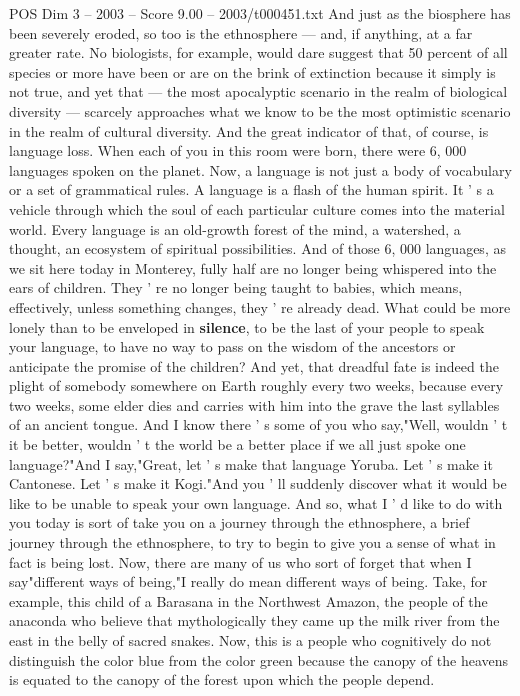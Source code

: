 \begin{textsample}{POS Dim 3 – 2003 – Score 9.00 – 2003/t000451.txt}
And just as the biosphere has been severely eroded, so too is the ethnosphere — and, if anything, at a far greater rate.
No biologists, for example, would dare suggest that 50 percent of all species or more have been or are on the brink of extinction because it simply is not true, and yet that — the most apocalyptic scenario in the realm of biological diversity — scarcely approaches what we know to be the most optimistic scenario in the realm of cultural diversity.
And the great indicator of that, of course, is language loss.
When each of you in this room were born, there were 6, 000 languages spoken on the planet.
Now, a language is not just a body of vocabulary or a set of grammatical rules.
A language is a flash of the human spirit.
It ' s a vehicle through which the soul of each particular culture comes into the material world.
Every language is an old-growth forest of the mind, a watershed, a thought, an ecosystem of spiritual possibilities.
And of those 6, 000 languages, as we sit here today in Monterey, fully half are no longer being whispered into the ears of children.
They ' re no longer being taught to babies, which means, effectively, unless something changes, they ' re already dead.
What could be more lonely than to be enveloped in \textbf{silence}, to be the last of your people to speak your language, to have no way to pass on the wisdom of the ancestors or anticipate the promise of the children?
And yet, that dreadful fate is indeed the plight of somebody somewhere on Earth roughly every two weeks, because every two weeks, some elder dies and carries with him into the grave the last syllables of an ancient tongue.
And I know there ' s some of you who say,"Well, wouldn ' t it be better, wouldn ' t the world be a better place if we all just spoke one language?"And I say,"Great, let ' s make that language Yoruba.
Let ' s make it Cantonese.
Let ' s make it Kogi."And you ' ll suddenly discover what it would be like to be unable to speak your own language.
And so, what I ' d like to do with you today is sort of take you on a journey through the ethnosphere, a brief journey through the ethnosphere, to try to begin to give you a sense of what in fact is being lost.
Now, there are many of us who sort of forget that when I say"different ways of being,"I really do mean different ways of being.
Take, for example, this child of a Barasana in the Northwest Amazon, the people of the anaconda who believe that mythologically they came up the milk river from the east in the belly of sacred snakes.
Now, this is a people who cognitively do not distinguish the color blue from the color green because the canopy of the heavens is equated to the canopy of the forest upon which the people depend.

\end{textsample}
